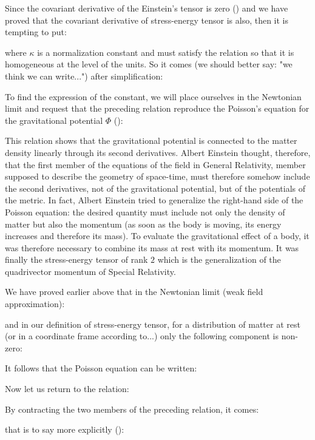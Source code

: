 	Since the covariant derivative of the Einstein's tensor is zero () and we have proved that the covariant derivative of stress-energy tensor is also, then it is tempting to put:
	
	where $\kappa$ is a normalization constant and must satisfy the relation so that it is homogeneous at the level of the units. So it comes (we should better say: "we think we can write...") after simplification:
	
	To find the expression of the constant, we will place ourselves in the Newtonian limit and request that the preceding relation reproduce the Poisson's equation for the gravitational potential $\Phi$ ():
	
	\begin{tcolorbox}[title=Remark,colframe=black,arc=10pt]
	This relation shows that the gravitational potential is connected to the matter density linearly through its second derivatives. Albert Einstein thought, therefore, that the first member of the equations of the field in General Relativity, member supposed to describe the geometry of space-time, must therefore somehow include the second derivatives, not of the gravitational potential, but of the potentials of the metric. In fact, Albert Einstein tried to generalize the right-hand side of the Poisson equation: the desired quantity must include not only the density of matter but also the momentum (as soon as the body is moving, its energy increases and therefore its mass). To evaluate the gravitational effect of a body, it was therefore necessary to combine its mass at rest with its momentum. It was finally the stress-energy tensor of rank $2$ which is the generalization of the quadrivector momentum of Special Relativity.
	\end{tcolorbox}
	We have proved earlier above that in the Newtonian limit (weak field approximation):
	
	and in our definition of stress-energy tensor, for a distribution of matter at rest (or in a coordinate frame according to...) only the following component is non-zero:
	
	It follows that the Poisson equation can be written:
	
	Now let us return to the relation:
	
	By contracting the two members of the preceding relation, it comes:
	
	that is to say more explicitly ():
	
